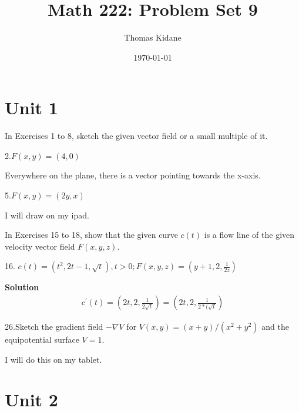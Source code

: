 \documentclass[12pt]{article}
\title{Math 222: Problem Set 9}
\author{Thomas Kidane}
\date{\today}
\begin{document}
\maketitle

\section*{Unit 1}

In Exercises 1 to 8, sketch the given vector field or a small multiple of it.

2.$F(x, y)= (4, 0)$

Everywhere on the plane, there is a vector pointing towards the x-axis.

5.$F(x, y)= (2y, x)$

I will draw on my ipad.

In Exercises 15 to 18, show that the given curve $c(t)$ is a flow line of the given velocity vector field $F(x, y, z)$.


16. $c(t)= (t^2, 2t-1, \sqrt{t}), t > 0; F(x, y, z)=
( y + 1, 2, \frac{1}{2z})$

\textbf{Solution}
\begin{align*}
  c^{'}(t)=(2t,2,\frac{1}{2\sqrt{t}}) = (2t,2,\frac{1}{2*(\sqrt{t}})
\end{align*}

26.Sketch the gradient field $- \nabla V$ for
$V (x, y)= (x + y)/(x^2 + y^2)$ and the equipotential
surface $V=1$.

I will do this on my tablet.

\section*{Unit 2}
\end{document}
